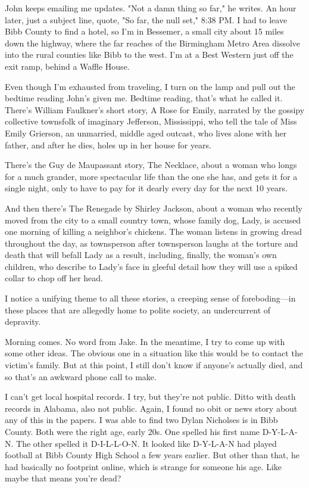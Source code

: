 \documentclass[10pt,a4paper]{article}
\newcommand{\speakerlabel}[1]{{\plantin\color{speakerblue}\MakeUppercase{#1}:}}
\newenvironment{narration}[1]{%
		\par\medskip\noindent\speakerlabel{#1}\enspace\ignorespaces
	}{\par\medskip}
\begin{document}
\begin{narration}{BRIAN REED}
John keeps emailing me updates. "Not a damn thing so far," he writes. An hour later, just a subject line, quote, "So far, the null set," 8:38 PM. I had to leave Bibb County to find a hotel, so I'm in Bessemer, a small city about 15 miles down the highway, where the far reaches of the Birmingham Metro Area dissolve into the rural counties like Bibb to the west. I'm at a Best Western just off the exit ramp, behind a Waffle House.

Even though I'm exhausted from traveling, I turn on the lamp and pull out the bedtime reading John's given me. Bedtime reading, that's what he called it. There's William Faulkner's short story, A Rose for Emily, narrated by the gossipy collective townsfolk of imaginary Jefferson, Mississippi, who tell the tale of Miss Emily Grierson, an unmarried, middle aged outcast, who lives alone with her father, and after he dies, holes up in her house for years.

There's the Guy de Maupassant story, The Necklace, about a woman who longs for a much grander, more spectacular life than the one she has, and gets it for a single night, only to have to pay for it dearly every day for the next 10 years.

And then there's The Renegade by Shirley Jackson, about a woman who recently moved from the city to a small country town, whose family dog, Lady, is accused one morning of killing a neighbor's chickens. The woman listens in growing dread throughout the day, as townsperson after townsperson laughs at the torture and death that will befall Lady as a result, including, finally, the woman's own children, who describe to Lady's face in gleeful detail how they will use a spiked collar to chop off her head.

I notice a unifying theme to all these stories, a creeping sense of foreboding—in these places that are allegedly home to polite society, an undercurrent of depravity.

Morning comes. No word from Jake. In the meantime, I try to come up with some other ideas. The obvious one in a situation like this would be to contact the victim's family. But at this point, I still don't know if anyone's actually died, and so that's an awkward phone call to make.

I can't get local hospital records. I try, but they're not public. Ditto with death records in Alabama, also not public. Again, I found no obit or news story about any of this in the papers. I was able to find two Dylan Nicholses is in Bibb County. Both were the right age, early 20s. One spelled his first name D-Y-L-A-N. The other spelled it D-I-L-L-O-N. It looked like D-Y-L-A-N had played football at Bibb County High School a few years earlier. But other than that, he had basically no footprint online, which is strange for someone his age. Like maybe that means you're dead?


\end{narration}
\end{document}
